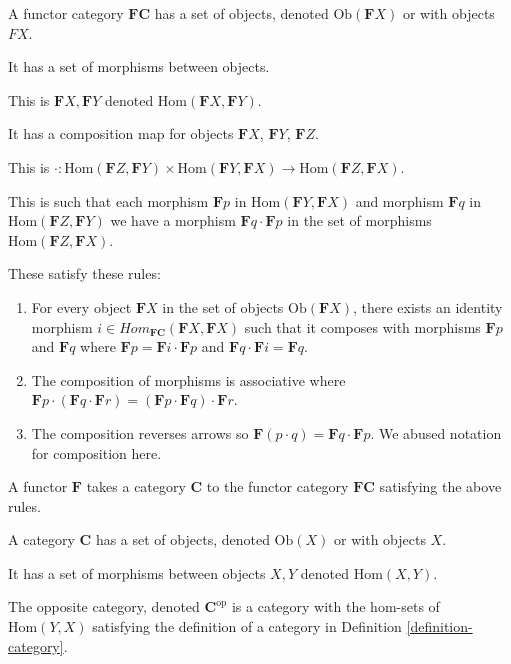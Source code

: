 \begin{definition}
	\label{definition-contravariant-functor}
	A functor category $\mathbf{FC}$ has a set of objects, denoted $\mathrm{Ob}(\mathbf{F}X)$ or with objects $FX$.
	
	It has a set of morphisms between objects.
	
	This is $\mathbf{F}X, \mathbf{F}Y$ denoted $\mathrm{Hom}(\mathbf{F}X,\mathbf{F}Y)$. 
	
	It has a composition map for objects $\mathbf{F}X$, $\mathbf{F}Y$, $\mathbf{F}Z$.
	
	This is $\cdot: \mathrm{Hom}(\mathbf{F}Z, \mathbf{F}Y) \times \mathrm{Hom}(\mathbf{F}Y,\mathbf{F}X) \rightarrow \mathrm{Hom}(\mathbf{F}Z, \mathbf{F}X)$.
	
	This is such that each morphism $\mathbf{F}p$ in $\mathrm{Hom}(\mathbf{F}Y,\mathbf{F}X)$ and morphism $\mathbf{F}q$ in $\mathrm{Hom}(\mathbf{F}Z, \mathbf{F}Y)$ we have a morphism $\mathbf{F}q \cdot \mathbf{F}p$ in the set of morphisms $\mathrm{Hom}(\mathbf{F}Z, \mathbf{F}X)$.

	These satisfy these rules:

	\begin{enumerate}
		\item For every object $\mathbf{F}X$ in the set of objects $\mathrm{Ob}(\mathbf{F}X)$, there exists an identity morphism $i \in Hom_\mathbf{FC}(\mathbf{F}X, \mathbf{F}X)$ such that it composes with morphisms $\mathbf{F}p$ and $\mathbf{F}q$ where $\mathbf{F}p = \mathbf{F}i \cdot \mathbf{F}p$ and $\mathbf{F}q \cdot \mathbf{F}i = \mathbf{F}q$.
		\item The composition of morphisms is associative where $\mathbf{F}p \cdot ( \mathbf{F}q \cdot \mathbf{F}r) = (\mathbf{F}p \cdot \mathbf{F}q) \cdot \mathbf{F}r$.
		\item The composition reverses arrows so $\mathbf{F}(p \cdot q) = \mathbf{F}q \cdot \mathbf{F}p$. We abused notation for composition here.
	\end{enumerate}

	A functor $\mathbf{F}$ takes a category $\mathbf{C}$ to the functor category $\mathbf{FC}$ satisfying the above rules.
\end{definition}

\begin{definition}
	\label{definition-op-category}
	A category $\mathbf{C}$ has a set of objects, denoted $\mathrm{Ob}(X)$ or with objects $X$.
	
	It has a set of morphisms between objects $X, Y$ denoted $\mathrm{Hom}(X,Y)$. 
	
	The opposite category, denoted $\mathbf{C}^\mathrm{op}$ is a category with the hom-sets of $\mathrm{Hom}(Y,X)$ satisfying the definition of a category in Definition \ref{definition-category}.
\end{definition}

